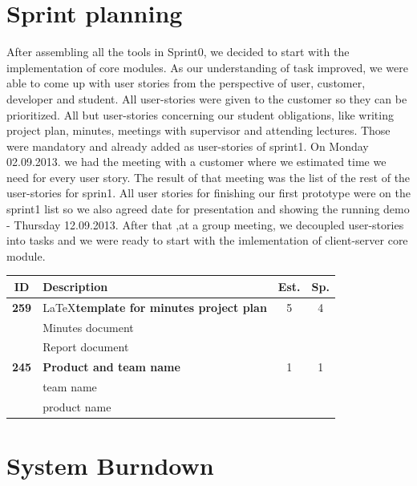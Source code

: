 \section{Sprint planning}
After assembling all the tools in Sprint0, we decided to start with the implementation of core modules.
As our understanding of task improved, we were able to come up with user stories from the perspective of user, customer, developer and student.
All user-stories were given to the customer so they can be prioritized. 
All but user-stories concerning our student obligations, like writing project plan, minutes, meetings with supervisor and attending lectures.
Those were mandatory and already added as user-stories of sprint1.
On Monday 02.09.2013. we had the meeting with a customer where we estimated time we need for every user story.
The result of that meeting was the list of the rest of the user-stories for sprin1.
All user stories for finishing our first prototype were on the sprint1 list so we also agreed date for presentation and showing the running demo - Thursday 12.09.2013. 
After that ,at a group meeting, we decoupled user-stories into tasks and we were ready to start with the imlementation of client-server core module.



\begin{longtable}{cp{8cm}cc}
\toprule
\textbf{ID} 	& \textbf{Description} 									& \textbf{Est.} & \textbf{Sp.} \\
\hline
\textbf{259} 	& \LaTeX \textbf{template for minutes project plan} 	& 5 			& 4 \\
				& Minutes document \\
				& Report document \\
\hline						
\textbf{245} 	& \textbf{Product and team name} 						& 1 			& 1 \\
				& team name \\
				& product name \\
\bottomrule
\end{longtable}

\section{System Burndown}

